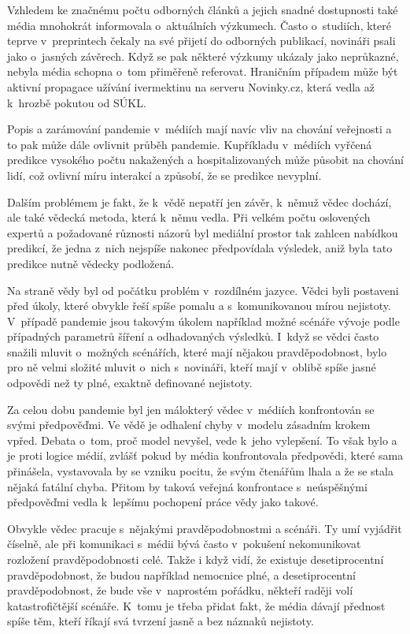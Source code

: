 Vzhledem ke značnému počtu odborných článků a jejich snadné dostupnosti také média mnohokrát informovala o~aktuálních výzkumech. Často o~studiích, které teprve v~preprintech čekaly na své přijetí do odborných publikací, novináři psali jako o~jasných závěrech. Když se pak některé výzkumy ukázaly jako neprůkazné, nebyla média schopna o~tom přiměřeně referovat. Hraničním případem může být aktivní propagace užívání ivermektinu na serveru Novinky.cz, která vedla až k~hrozbě pokutou od SÚKL.

Popis a zarámování pandemie v~médiích mají navíc vliv na chování veřejnosti a to pak může dále ovlivnit průběh pandemie. Kupříkladu v~médiích vyřčená predikce vysokého počtu nakažených a hospitalizovaných může působit na chování lidí, což ovlivní míru interakcí a způsobí, že se predikce nevyplní.

Dalším problémem je fakt, že k~vědě nepatří jen závěr, k~němuž vědec dochází, ale také vědecká metoda, která k~němu vedla. Při velkém počtu oslovených expertů a požadované  různosti názorů byl mediální prostor tak zahlcen nabídkou predikcí, že jedna z~nich nejspíše nakonec  předpovídala výsledek, aniž byla tato predikce nutně vědecky podložená.

Na straně vědy byl od počátku problém v~rozdílném jazyce. Vědci byli postaveni před úkoly, které obvykle řeší spíše pomalu a s~komunikovanou mírou nejistoty. V~případě pandemie jsou takovým úkolem například možné scénáře vývoje podle případných parametrů šíření a odhadovaných výsledků. I~když se vědci často snažili mluvit o~možných scénářích, které mají nějakou pravděpodobnost, bylo pro ně velmi složité mluvit o~nich s~novináři, kteří mají v~oblibě spíše jasné odpovědi než ty plné, exaktně definované nejistoty.

Za celou dobu pandemie byl jen málokterý vědec v~médiích konfrontován se svými předpověďmi. Ve vědě je odhalení chyby v~modelu zásadním krokem vpřed. Debata o~tom, proč model nevyšel, vede k~jeho vylepšení. To však bylo a je proti logice médií, zvlášť pokud by média konfrontovala předpovědi, které sama přinášela, vystavovala by se vzniku pocitu, že svým čtenářům lhala a že se stala nějaká fatální chyba. Přitom by taková veřejná konfrontace s~neúspěšnými předpověďmi vedla k~lepšímu pochopení práce vědy jako takové.

Obvykle vědec pracuje s~nějakými prav\-dě\-po\-dob\-nost\-mi a scénáři. Ty umí vyjádřit číselně, ale při komunikaci s~médii bývá často v~pokušení nekomunikovat rozložení pravděpodobnosti celé. Takže i když vidí, že existuje desetiprocentní prav\-dě\-po\-dob\-nost, že budou například nemocnice plné, a desetiprocentní prav\-dě\-po\-dob\-nost, že bude vše v~naprostém pořádku, někteří raději volí katastrofičtější scénáře. K~tomu je třeba přidat fakt, že média dávají přednost spíše těm, kteří říkají svá tvrzení jasně a bez náznaků nejistoty.

